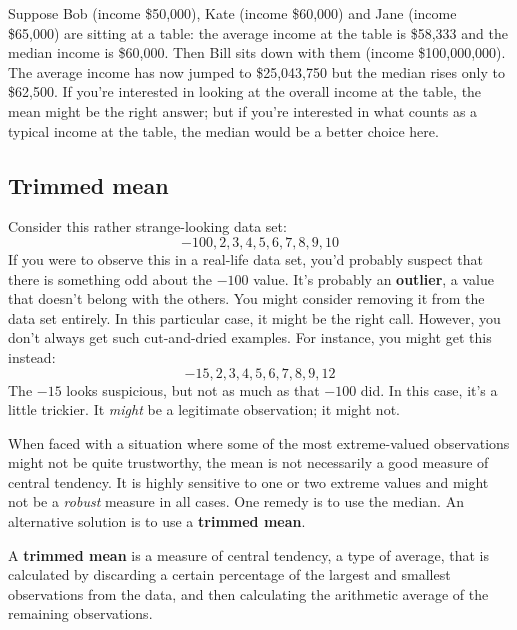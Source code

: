 \documentclass[
  11pt,
  a4paper,
  twoside,symmetric,openright]{book}
\theoremstyle{break}
\theoremstyle{break}
\begin{document}
\begin{example}
\protect\hypertarget{exm:exmeanmedian}{}\label{exm:exmeanmedian}Suppose Bob (income \$50,000), Kate (income \$60,000) and Jane (income \$65,000) are sitting at a table: the average income at the table is \$58,333 and the median income is \$60,000. Then Bill sits down with them (income \$100,000,000). The average income has now jumped to \$25,043,750 but the median rises only to \$62,500. If you're interested in looking at the overall income at the table, the mean might be the right answer; but if you're interested in what counts as a typical income at the table, the median would be a better choice here.
\end{example}

\hypertarget{trimmedmean}{%
\subsection{Trimmed mean}\label{trimmedmean}}

\begin{example}[Outliers]
\protect\hypertarget{exm:exoutliers}{}\label{exm:exoutliers}Consider this rather strange-looking data set:
\[
-100,2,3,4,5,6,7,8,9,10
\]
If you were to observe this in a real-life data set, you'd probably suspect that there is something odd about the \(-100\) value. It's probably an \textbf{outlier}, a value that doesn't belong with the others. You might consider removing it from the data set entirely. In this particular case, it might be the right call. However, you don't always get such cut-and-dried examples. For instance, you might get this instead:
\[
-15,2,3,4,5,6,7,8,9,12
\]
The \(-15\) looks suspicious, but not as much as that \(-100\) did. In this case, it's a little trickier. It \emph{might} be a legitimate observation; it might not.
\end{example}

When faced with a situation where some of the most extreme-valued observations might not be quite trustworthy, the mean is not necessarily a good measure of central tendency. It is highly sensitive to one or two extreme values and might not be a \emph{robust} measure in all cases. One remedy is to use the median. An alternative solution is to use a \textbf{trimmed mean}.

\begin{definition}
\protect\hypertarget{def:deftrimmedmean}{}\label{def:deftrimmedmean}A \textbf{trimmed mean} is a measure of central tendency, a type of average, that is calculated by discarding a certain percentage of the largest and smallest observations from the data, and then calculating the arithmetic average of the remaining observations.
\end{definition}
\end{document}
